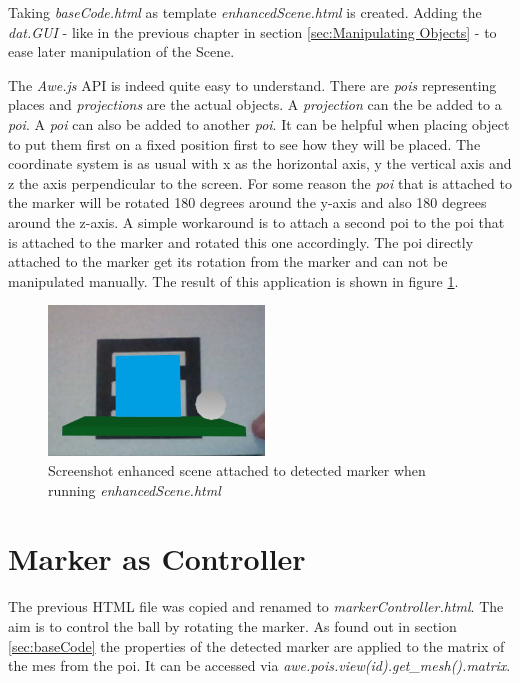 Taking \textit{baseCode.html} as template \textit{enhancedScene.html} is created. Adding the \textit{dat.GUI} - like in the previous chapter in section \ref{sec:Manipulating Objects} - to ease later manipulation of the Scene. 

The \textit{Awe.js} API is indeed quite easy to understand. There are \textit{pois} representing places and \textit{projections} are the actual objects. A \textit{projection} can the be added to a \textit{poi}. A \textit{poi} can also be added to another \textit{poi}. It can be helpful when placing object to put them first on a fixed position first to see how they will be placed. The coordinate system is as usual with x as the horizontal axis, y the vertical axis and z the axis perpendicular to the screen. 
For some reason the \textit{poi} that is attached to the marker will be rotated 180 degrees around the y-axis and also 180 degrees around the z-axis. A simple workaround is to attach a second poi to the poi that is attached to the marker and rotated this one accordingly. The poi directly attached to the marker get its rotation from the marker and can not be manipulated manually.
The result of this application is shown in figure \ref{fig:enhancedScene}. 

\begin{figure}[h]
    \centering
    \includegraphics[height=4cm]{Document/Figures/chapter3/ScreenshotMarkerDetectedEnhancedScene.jpg}
    \caption[Screenshot enhanced scene on marker]{Screenshot enhanced scene attached to detected marker when  running \mbox{\textit{enhancedScene.html}}}
    \label{fig:enhancedScene}
\end{figure}


\section{Marker as Controller}
\label{sec:markerController}

The previous HTML file was copied and renamed to \textit{markerController.html}. The aim is to control the ball by rotating the marker. As found out in section \ref{sec:baseCode} the properties of the detected marker are applied to the matrix of the mes from the poi. It can be accessed via \mbox{\textit{awe.pois.view(id).get\_mesh().matrix}}.

